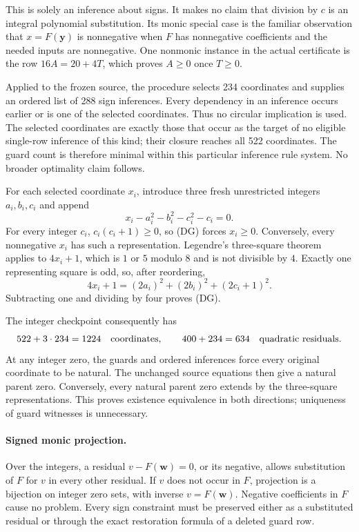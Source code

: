 This is solely an inference about signs. It makes no claim that division
by $c$ is an integral polynomial substitution. Its monic special case is
the familiar observation that $x=F(\boldsymbol y)$ is nonnegative when
$F$ has nonnegative coefficients and the needed inputs are nonnegative.
One nonmonic instance in the actual certificate is the row
$16A=20+4T$, which proves $A\ge0$ once $T\ge0$.

Applied to the frozen source, the procedure selects 234 coordinates and
supplies an ordered list of 288 sign inferences. Every dependency in an
inference occurs earlier or is one of the selected coordinates. Thus no
circular implication is used. The selected coordinates are exactly those
that occur as the target of no eligible single-row inference of this kind;
their closure reaches all 522 coordinates. The guard count is therefore
minimal within this particular inference rule system. No broader
optimality claim follows.

For each selected coordinate $x_i$, introduce three fresh unrestricted
integers $a_i,b_i,c_i$ and append
\[
 x_i-a_i^2-b_i^2-c_i^2-c_i=0.                 \tag{DG}
\]
For every integer $c_i$, $c_i(c_i+1)\ge0$, so (DG) forces $x_i\ge0$.
Conversely, every nonnegative $x_i$ has such a representation. Legendre's
three-square theorem applies to $4x_i+1$, which is $1$ or $5$ modulo $8$
and is not divisible by $4$. Exactly one representing square is odd,
so, after reordering,
\[
 4x_i+1=(2a_i)^2+(2b_i)^2+(2c_i+1)^2.
\]
Subtracting one and dividing by four proves (DG).

The integer checkpoint consequently has
\[
 522+3\cdot234=1224\quad\hbox{coordinates},
 \qquad 400+234=634\quad\hbox{quadratic residuals}.
\]
At any integer zero, the guards and ordered inferences force every
original coordinate to be natural. The unchanged source equations then
give a natural parent zero. Conversely, every natural parent zero extends
by the three-square representations. This proves existence equivalence
in both directions; uniqueness of guard witnesses is unnecessary.

\paragraph{Signed monic projection.}
Over the integers, a residual $v-F(\boldsymbol w)=0$, or its negative,
allows substitution of $F$ for $v$ in every other residual. If $v$ does
not occur in $F$, projection is a bijection on integer zero sets, with
inverse $v=F(\boldsymbol w)$. Negative coefficients in $F$ cause no
problem. Every sign constraint must be preserved either as a substituted
residual or through the exact restoration formula of a deleted guard row.

